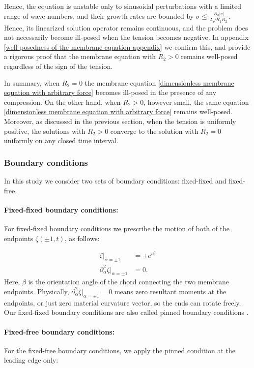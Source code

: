 \documentclass{article}[12pt]
\theoremstyle{Theorem}
\begin{document}
Hence, the equation is unstable only to sinusoidal perturbations with a limited range of wave numbers, and their growth rates are bounded by $\sigma \leq \frac{R_3|e|}{2\sqrt{R_1R_2}}$.
Hence, its linearized solution operator remains continuous, and the problem does not necessarily become ill-posed when the tension becomes negative. In appendix \ref{well-posedness of the membrane equation appendix} we confirm this, and provide a rigorous proof that the membrane equation with $R_2 > 0$ remains well-posed regardless of the sign of the tension.
\newline

In summary, when $R_2 = 0$ the membrane equation \eqref{dimensionless membrane equation with arbitrary force} becomes ill-posed in the presence of any compression. On the other hand, when $R_2 >0$, however small, the same equation \eqref{dimensionless membrane equation with arbitrary force} remains well-posed. Moreover, as discussed in the previous section, when the tension is uniformly positive, the solutions with $R_2 > 0$ converge to the solution with $R_2 = 0$ uniformly on any closed time interval.


\subsubsection{Boundary conditions}
In this study we consider two sets of boundary conditions: fixed-fixed and fixed-free.

\paragraph{Fixed-fixed boundary conditions:}

For fixed-fixed boundary conditions we prescribe the motion of both of the endpoints $\zeta(\pm1,t)$, as follows:

\begin{align}
    \zeta|_{\alpha=\pm1} &= \pm e^{i\beta} \\
\partial_\alpha^2\zeta\big|_{\alpha =\pm1} &= 0. 
\end{align}
Here, $\beta$ is the orientation angle of the chord connecting the two membrane endpoints. Physically, $\partial_\alpha^2\zeta\big|_{\alpha =\pm1} = 0$ means zero resultant moments at the endpoints, or just zero material curvature vector, so the ends can rotate freely. Our fixed-fixed boundary conditions are also called pinned boundary conditions \cite{timoshenko1959theory}.

\paragraph{Fixed-free boundary conditions:}
For the fixed-free boundary conditions, we apply the pinned condition at the leading edge only:
\end{document}
